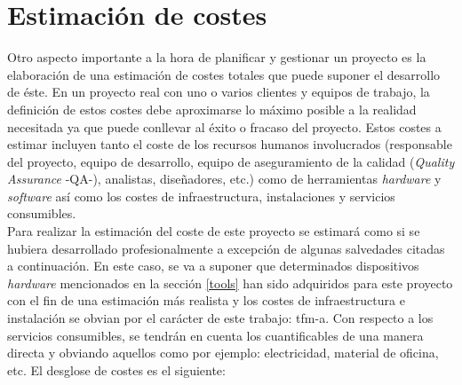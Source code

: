 \documentclass[12pt,a4paper, twoside]{report}
\begin{document}
\begin{itemize}
%		
		
	\end{itemize}
	
	\newpage
	
	\section{Estimación de costes}
		
	Otro aspecto importante a la hora de planificar y gestionar un proyecto es la elaboración de una estimación de costes totales que puede suponer el desarrollo de éste. En un proyecto real con uno o varios clientes y equipos de trabajo, la definición de estos costes debe aproximarse lo máximo posible a la realidad necesitada ya que puede conllevar al éxito o fracaso del proyecto. Estos costes a estimar incluyen tanto el coste de los recursos humanos involucrados (responsable del proyecto, equipo de desarrollo, equipo de aseguramiento de la calidad (\textit{Quality Assurance} -QA-), analistas, diseñadores, etc.) como de herramientas \textit{hardware} y \textit{software} así como los costes de infraestructura, instalaciones y servicios consumibles. \\
	
	Para realizar la estimación del coste de este proyecto se estimará como si se hubiera desarrollado profesionalmente a excepción de algunas salvedades citadas a continuación. En este caso, se va a suponer que determinados dispositivos \textit{hardware} mencionados en la sección \ref{tools} han sido adquiridos para este proyecto con el fin de una estimación más realista y los costes de infraestructura e instalación se obvian por el carácter de este trabajo: \gls{tfm-a}. Con respecto a los servicios consumibles, se tendrán en cuenta los cuantificables de una manera directa y obviando aquellos como por ejemplo: electricidad, material de oficina, etc. El desglose de costes es el siguiente: \\
	
\end{document}
